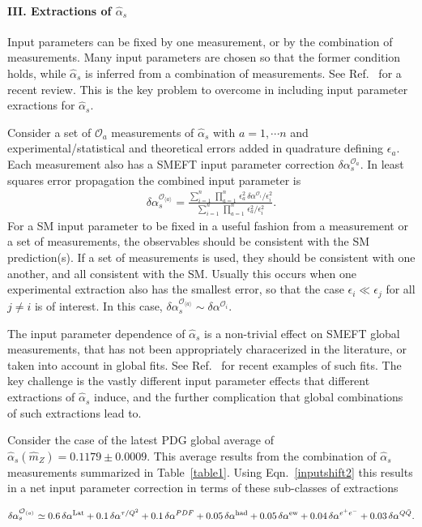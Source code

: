 \documentclass[twocolumn,nofootinbib,amsmath,amssymb,prl,aps,superscriptaddress,tightenlines,preprintnumbers]{revtex4}
\newcommand{\bea}{\begin{eqnarray}}
\newcommand{\eea}{\end{eqnarray}}
\begin{document}
\paragraph{\bf III. Extractions of $\hat{\alpha}_s$}
Input parameters can be fixed by one measurement, or by the combination of measurements. Many input parameters are chosen so that the former condition holds, while $\hat{\alpha}_s$ is inferred from a
combination of measurements. See Ref.~\cite{dEnterria:2022hzv} for a recent review.
This is the key problem to overcome in including input parameter exractions for $\hat{\alpha}_s$.

Consider a set of $\mathcal{O}_a$ measurements of $\hat{\alpha}_s$
with $a=1, \cdots n$ and experimental/statistical and theoretical errors added in quadrature defining
$\epsilon_a$.
Each measurement also has a SMEFT input parameter
correction $\delta \alpha^{\mathcal{O}_a}_s$.
In least squares error propagation
the combined input parameter is
\bea
\label{inputshift2}
\delta \alpha^{\mathcal{O}_{\langle a \rangle}}_s = \frac{\sum_{i=1}^n  \, \prod_{a=1}^{n} \, \epsilon_a^2 \, \delta \alpha^{\mathcal{O}_{i}}/\epsilon_i^2}{\sum_{i=1}^n  \, \prod_{a=1}^n \, \epsilon_a^2/\epsilon_i^2}.
\eea
For a SM input parameter to be fixed in a useful fashion from a measurement or a set of
measurements, the observables should be consistent with the SM prediction(s).
If a set of measurements is used, they should be consistent with one another, and
all consistent with the SM.
Usually this occurs when one experimental extraction also has the smallest error, so that
the case $\epsilon_i \ll \epsilon_j $ for all $j \neq i$
is of interest. In this case, $\delta \alpha^{\mathcal{O}_{\langle a \rangle}}_s \sim  \delta \alpha^{\mathcal{O}_{i}}$.

The input parameter dependence of $\hat{\alpha}_s$ is a non-trivial effect on SMEFT global measurements,
that has not been appropriately characerized in the literature, or taken into account in global fits.
See Ref.~\cite{Ellis:2020unq,Almeida:2021asy,Ethier:2021bye,ATLAS:2022xyx} for recent examples of such fits.
The key challenge is the vastly different input parameter effects that different extractions of $\hat{\alpha}_s$
induce, and the further complication that global combinations of such extractions lead to.

Consider the case of the latest PDG global average of $\hat{\alpha}_s(\hat{m}_Z) =
0.1179 \pm 0.0009$. This average results from the combination of $\hat{\alpha}_s$ measurements summarized
in Table~\ref{table1}. Using Eqn.~\ref{inputshift2}
this results in a net input parameter correction in terms of these sub-classes of extractions
\begin{widetext}
\bea\label{summedaverage}
\delta \alpha^{\mathcal{O}_{\langle a \rangle}}_s \simeq
0.6 \, \delta \alpha^{\rm Lat}
+ 0.1 \, \delta \alpha^{\tau/Q^2}
+ 0.1 \, \delta \alpha^{PDF}
+ 0.05 \, \delta \alpha^{\rm had}
+ 0.05 \, \delta \alpha^{\rm ew}
+ 0.04 \, \delta \alpha^{e^+ e^-}
+0.03 \, \delta \alpha^{Q\bar{Q}}.
\eea
\end{widetext}
\end{document}
